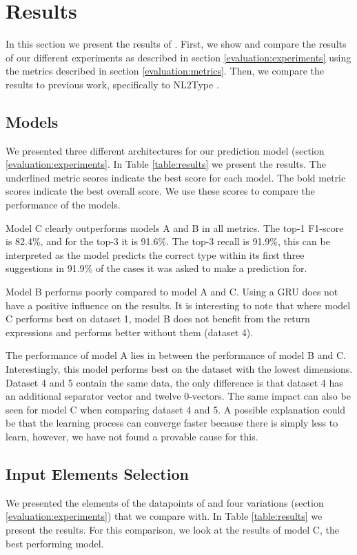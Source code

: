 \section{Results}
In this section we present the results of \dltpy. First, we show and compare the results of our different experiments as described in section \ref{evaluation:experiments} using the metrics described in section \ref{evaluation:metrics}. Then, we compare the results to previous work, specifically to NL2Type \cite{Malik2019NL2Type:Information}.



\subsection{Models} \label{results:models}
We presented three different architectures for our prediction model (section \ref{evaluation:experiments}. In Table \ref{table:results} we present the results. The underlined metric scores indicate the best score for each model. The bold metric scores indicate the best overall score. We use these scores to compare the performance of the models.

Model C clearly outperforms models A and B in all metrics. The top-1 F1-score is 82.4\%, and for the top-3 it is 91.6\%. The top-3 recall is 91.9\%, this can be interpreted as the model predicts the correct type within its first three suggestions in 91.9\% of the cases it was asked to make a prediction for. 

Model B performs poorly compared to model A and C. Using a GRU does not have a positive influence on the results. It is interesting to note that where model C performs best on dataset 1, model B does not benefit from the return expressions and performs better without them (dataset 4). 

The performance of model A lies in between the performance of model B and C. Interestingly, this model performs best on the dataset with the lowest dimensions. Dataset 4 and 5 contain the same data, the only difference is that dataset 4 has an additional separator vector and twelve 0-vectors. The same impact can also be seen for model C when comparing dataset 4 and 5. A possible explanation could be that the learning process can converge faster because there is simply less to learn, however, we have not found a provable cause for this.

\subsection{Input Elements Selection}
We presented the elements of the datapoints of \dltpy{} and four variations (section \ref{evaluation:experiments}) that we compare with. In Table \ref{table:results} we present the results. For this comparison, we look at the results of model C, the best performing model.


